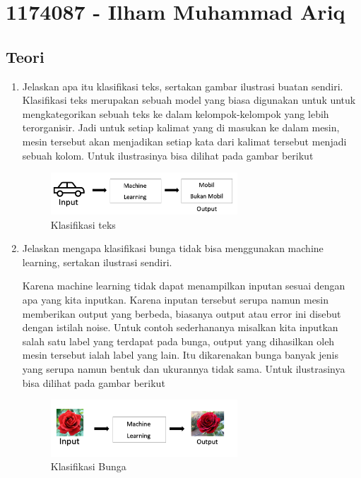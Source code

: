 \section{1174087 - Ilham Muhammad Ariq}
\subsection{Teori}
\begin{enumerate}

	\item Jelaskan apa itu klasifikasi teks, sertakan gambar ilustrasi buatan sendiri.
	\hfill\break
	Klasifikasi teks merupakan sebuah model yang biasa digunakan untuk untuk mengkategorikan sebuah teks ke dalam kelompok-kelompok yang lebih terorganisir. Jadi untuk setiap kalimat yang di masukan ke dalam mesin, mesin tersebut akan menjadikan setiap kata dari kalimat tersebut menjadi sebuah kolom. Untuk ilustrasinya bisa dilihat pada gambar berikut 

	\begin{figure}[H]
	\centering
		\includegraphics[width=7cm]{figures/1174087/4/1.png}
		\caption{Klasifikasi teks}
	\end{figure}

	\item Jelaskan mengapa klasiﬁkasi bunga tidak bisa menggunakan machine learning, sertakan ilustrasi sendiri.
	
	\hfill\break
	Karena machine learning tidak dapat menampilkan inputan sesuai dengan apa yang kita inputkan. Karena inputan tersebut serupa namun mesin memberikan output yang berbeda, biasanya output atau error ini disebut dengan istilah noise. Untuk contoh sederhananya misalkan kita inputkan salah satu label yang terdapat pada bunga, output yang dihasilkan oleh mesin tersebut ialah label yang lain. Itu dikarenakan bunga banyak jenis yang serupa namun bentuk dan ukurannya tidak sama. Untuk ilustrasinya bisa dilihat pada gambar berikut 

	\begin{figure}[H]
	\centering
		\includegraphics[width=7cm]{figures/1174087/4/2.png}
		\caption{Klasifikasi Bunga}
	\end{figure}


\end{enumerate}
